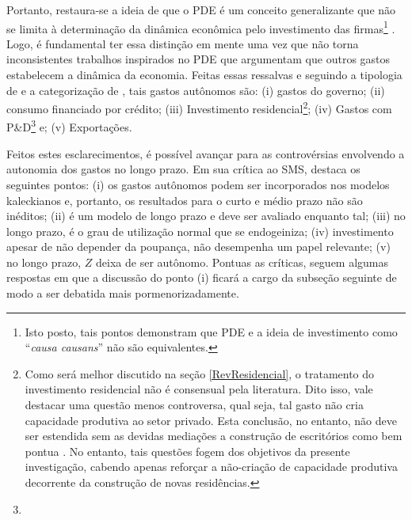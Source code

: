 Portanto, restaura-se a ideia de que o PDE é um conceito generalizante que não se limita à determinação da dinâmica econômica pelo investimento das firmas\footnote{
	Isto posto, tais pontos demonstram que PDE e a ideia de investimento como ``\textit{causa causans}'' não são equivalentes.}
\cite{brochier_macroeconomics_2017}. 
Logo, é fundamental ter essa distinção em mente uma vez que não torna inconsistentes trabalhos inspirados no PDE que argumentam que  outros gastos estabelecem a dinâmica da economia.
Feitas essas ressalvas e seguindo a tipologia de \textcite{cesaratto_technical_2003} e a categorização de \textcite{serrano_sraffian_1995}, tais gastos autônomos são: (i) gastos do governo; (ii) consumo financiado por crédito; (iii) Investimento residencial\footnote{
	Como será melhor discutido na seção \ref{RevResidencial}, o tratamento do investimento residencial não é consensual pela literatura. Dito isso, vale destacar uma questão menos controversa, qual seja, tal gasto não cria capacidade produtiva ao setor privado. Esta conclusão, no entanto, não deve ser estendida sem as devidas mediações a construção de escritórios como bem pontua \textcite{duesenberry_investment_1958}. No entanto, tais questões fogem dos objetivos da presente investigação, cabendo apenas reforçar a não-criação de capacidade produtiva decorrente da construção de novas residências.
}; (iv) Gastos com P\&D\footnote{
} e; (v) Exportações.

Feitos estes esclarecimentos, é possível avançar para as controvérsias envolvendo a autonomia dos gastos no longo prazo. 
Em sua crítica ao SMS, \textcite{nikiforos_comments_2018} destaca os seguintes pontos: 
(i) os gastos autônomos podem ser incorporados nos modelos kaleckianos e, portanto, os resultados para o curto e médio prazo não são inéditos; 
(ii) é um modelo de longo prazo e deve ser avaliado enquanto tal; 
(iii) no longo prazo, é o grau de utilização normal que se endogeiniza; 
(iv) investimento apesar de não depender da poupança, não desempenha um papel relevante; 
(v) no longo prazo, $Z$ deixa de ser autônomo.  
Pontuas as críticas, seguem algumas respostas em que a discussão do ponto (i) ficará a cargo da subseção seguinte de modo a ser debatida mais pormenorizadamente.

